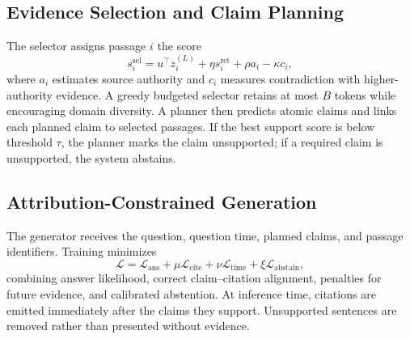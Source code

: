 \subsection{Evidence Selection and Claim Planning}

The selector assigns passage $i$ the score
\begin{equation}
 s_i^{\mathrm{sel}} = u^\top z_i^{(L)}
 + \eta s_i^{\mathrm{ret}} + \rho a_i - \kappa c_i,
 \label{eq:selection}
\end{equation}
where $a_i$ estimates source authority and $c_i$ measures contradiction with
higher-authority evidence.  A greedy budgeted selector retains at most $B$
tokens while encouraging domain diversity.  A planner then predicts atomic
claims and links each planned claim to selected passages.  If the best support
score is below threshold $\tau$, the planner marks the claim unsupported; if a
required claim is unsupported, the system abstains.

\subsection{Attribution-Constrained Generation}

The generator receives the question, question time, planned claims, and passage
identifiers.  Training minimizes
\begin{equation}
 \mathcal{L} = \mathcal{L}_{\mathrm{ans}}
 + \mu\mathcal{L}_{\mathrm{cite}}
 + \nu\mathcal{L}_{\mathrm{time}}
 + \xi\mathcal{L}_{\mathrm{abstain}},
 \label{eq:loss}
\end{equation}
combining answer likelihood, correct claim--citation alignment, penalties for
future evidence, and calibrated abstention.  At inference time, citations are
emitted immediately after the claims they support.  Unsupported sentences are
removed rather than presented without evidence.

